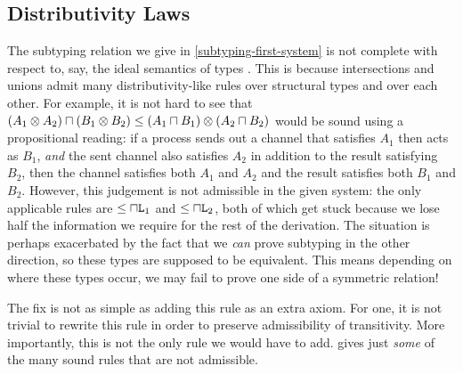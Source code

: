 \subsection{Distributivity Laws}
\label{distributivity}

The subtyping relation we give in \cref{subtyping-first-system} is not complete with respect to, say, the ideal semantics of types \cite{VouillonM04, Damm94}. This is because intersections and unions admit many distributivity-like rules over structural types and over each other. For example, it is not hard to see that $(A_1 \otimes A_2) \mathbin{\sqcap} (B_1 \otimes B_2) \le (A_1 \mathbin{\sqcap} B_1) \otimes (A_2 \mathbin{\sqcap} B_2)$ would be sound using a propositional reading: if a process sends out a channel that satisfies $A_1$ then acts as $B_1$, \emph{and} the sent channel also satisfies $A_2$ in addition to the result satisfying $B_2$, then the channel satisfies both $A_1$ and $A_2$ and the result satisfies both $B_1$ and $B_2$. However, this judgement is not admissible in the given system: the only applicable rules are $\le{\mathbin{\sqcap}\texttt{L}_1}$ and $\le{\mathbin{\sqcap}\texttt{L}_2}$, both of which get stuck because we lose half the information we require for the rest of the derivation. The situation is perhaps exacerbated by the fact that we \emph{can} prove subtyping in the other direction, so these types are supposed to be equivalent. This means depending on where these types occur, we may fail to prove one side of a symmetric relation!

The fix is not as simple as adding this rule as an extra axiom. For one, it is not trivial to rewrite this rule in order to preserve admissibility of transitivity. More importantly, this is not the only rule we would have to add.  gives just \emph{some} of the many sound rules that are not admissible.

